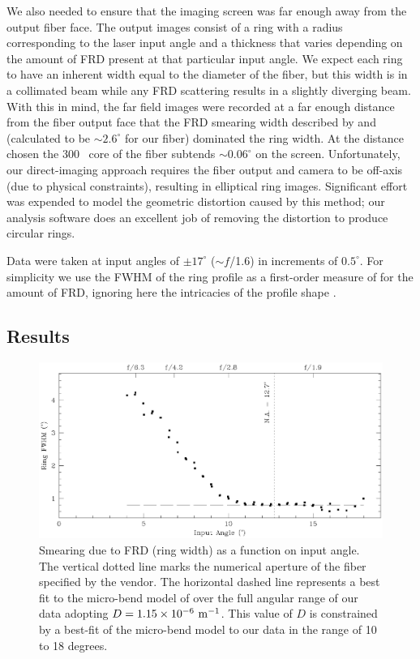 We also needed to ensure that the imaging screen was far enough away
from the output fiber face. The output images consist of a ring with a
radius corresponding to the laser input angle and a thickness that
varies depending on the amount of FRD present at that particular input
angle. We expect each ring to have an inherent width equal to the
diameter of the fiber, but this width is in a collimated beam while
any FRD scattering results in a slightly diverging beam. With this in
mind, the far field images were recorded at a far enough distance from
the fiber output face that the FRD smearing width described by
\citet{Carrasco} and \citet{Haynes11} (calculated to be $\sim
2.6^{\circ}$ for our fiber) dominated the ring width. At the distance
chosen the 300 \mum\ core of the fiber subtends $\sim 0.06^{\circ}$ on
the screen.  Unfortunately, our direct-imaging approach requires the
fiber output and camera to be off-axis (due to physical constraints),
resulting in elliptical ring images. Significant effort was expended
to model the geometric distortion caused by this method; our analysis
software does an excellent job of removing the distortion to produce
circular rings.

Data were taken at input angles of $\pm17^{\circ}$ ($\sim f$/1.6) in
increments of $0.5^{\circ}$. For simplicity we use the FWHM of the
ring profile as a first-order measure of for the amount of FRD,
ignoring here the intricacies of the profile shape
\citep{Haynes11,Carrasco}.

\subsection{Results}

\begin{figure}[ht]
\begin{center}
\includegraphics[width=\textwidth,trim=0 0.3in 0 3.8in,clip=true]{FRD/figs/angles.eps}
\caption[Dependence of FRD on input angle]{\fixspacing\label{fig:angle}
  Smearing due to FRD (ring width) as a function on input angle. The vertical
  dotted line marks the numerical aperture of the fiber specified by the
  vendor. The horizontal dashed line represents a best fit to the micro-bend
  model of \citet{Carrasco} over the full angular range
  of our data adopting $D=1.15\times 10^{-6}~\mathrm{m^{-1}} $. This value of $D$
  is constrained by a best-fit of the micro-bend model to our data in the
  range of 10 to 18 degrees.}
\end{center}
\end{figure}

